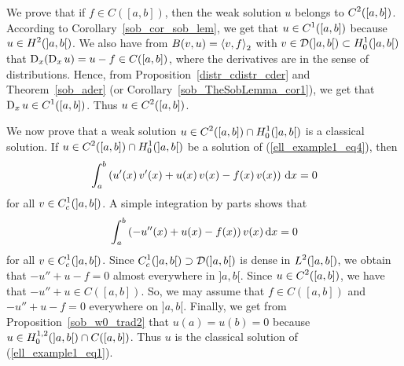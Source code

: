 \begin{egg}
We prove that if $f \in C([a,b])$, then the weak solution $u$
belongs to $\displaystyle C^2([a,b])$.  According to
Corollary~\ref{sob_cor_sob_lem},
we get that $\displaystyle u \in C^1([a,b])$ because
$\displaystyle u\in H^2(]a,b[)$.  We also
have from $B(v,u)=\left\langle{v} , {f}\right\rangle_2$ with
$\displaystyle v\in \mathcal{D}(]a,b[) \subset H^1_0(]a,b[)$
that $\operatorname{D}_x(\operatorname{D}_x u) = u - f \in C([a,b])$, where
the derivatives are in the sense of distributions.  Hence, from
Proposition~\ref{distr_cdistr_cder} and Theorem~\ref{sob_ader}
(or Corollary~\ref{sob_TheSobLemma_cor1}), we get that
$\displaystyle \operatorname{D}_x u \in C^1([a,b])$.
Thus $\displaystyle u\in C^2([a,b])$.

We now prove that a weak solution
$\displaystyle u \in C^2([a,b]) \cap H^1_0(]a,b[)$
is a classical solution.  If
$\displaystyle u \in C^2([a,b]) \cap H^1_0(]a,b[)$ be
a solution of (\ref{ell_example1_eq4}), then
\[
\int_a^b \left( u'(x)\,v'(x) + u(x)\, v(x) -f(x)\, v(x) \right) \,\mathrm{d}{x} = 0
\]
for all $\displaystyle v \in C^1_c(]a,b[)$.
A simple integration by parts shows that
\[
\int_a^b \left( -u''(x) + u(x) -f(x)\right) v(x) \,\mathrm{d}{x} = 0
\]
for all $\displaystyle v \in C^1_c(]a,b[)$.
Since $\displaystyle C^1_c(]a,b[) \supset \mathcal{D}(]a,b[)$ is dense in
$\displaystyle L^2(]a,b[)$, we obtain that
$-u'' + u -f = 0$ almost everywhere in $]a,b[$.  Since
$\displaystyle u\in C^2([a,b])$, we have that 
$- u'' + u \in C([a,b])$.  So, we may assume that 
$f \in C([a,b])$ and $-u'' + u -f = 0$
everywhere on $]a,b[$.  Finally, we get from
Proposition~\ref{sob_w0_trad2} that $u(a)=u(b)= 0$ because
$\displaystyle u \in H^{1,2}_0(]a,b[) \cap C([a,b])$.  Thus $u$ is the classical
solution of (\ref{ell_example1_eq1}).
\end{egg}

